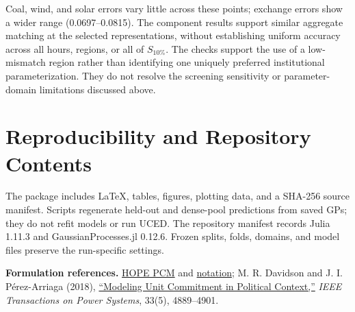 \documentclass[11pt,a4paper]{article}
\begin{document}
\begin{center}
\label{tab:components}
\small
\end{center}
Coal, wind, and solar errors vary little across these points; exchange
errors show a wider range (0.0697--0.0815). The component results support
similar aggregate matching at the selected representations, without
establishing uniform accuracy across all hours, regions, or all of $S_{10\%}$.
The checks support the use of a low-mismatch region rather than identifying
one uniquely preferred institutional parameterization. They do not resolve
the screening sensitivity or parameter-domain limitations discussed above.

\section{Reproducibility and Repository Contents}
The package includes LaTeX, tables, figures, plotting data, and a SHA-256
source manifest. Scripts regenerate held-out and dense-pool predictions from
saved GPs; they do not refit models or run UCED. The repository manifest
records Julia 1.11.3 and GaussianProcesses.jl 0.12.6. Frozen splits, folds,
domains, and model files preserve the run-specific settings.

{\footnotesize\textbf{Formulation references.}
\href{https://hope-model-project.github.io/HOPE/dev/PCM/}{HOPE PCM} and
\href{https://hope-model-project.github.io/HOPE/dev/notation/}{notation};
M. R. Davidson and J. I. P\'erez-Arriaga (2018),
\href{https://doi.org/10.1109/TPWRS.2018.2822480}{``Modeling Unit Commitment
in Political Context,''} \textit{IEEE Transactions on Power Systems},
33(5), 4889--4901.}
\end{document}
